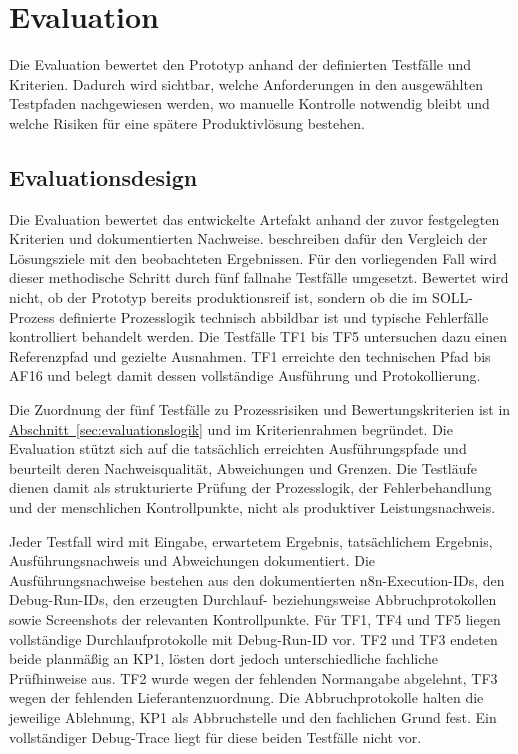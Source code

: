 \documentclass[a4paper,12pt]{article}
\begin{document}
\clearpage
\section{Evaluation}
\label{sec:evaluation}
Die Evaluation bewertet den Prototyp anhand der definierten Testfälle und Kriterien. Dadurch wird sichtbar, welche Anforderungen in den ausgewählten Testpfaden nachgewiesen werden, wo manuelle Kontrolle notwendig bleibt und welche Risiken für eine spätere Produktivlösung bestehen.

\subsection{Evaluationsdesign}
Die Evaluation bewertet das entwickelte Artefakt anhand der zuvor festgelegten Kriterien und dokumentierten Nachweise. \Textcite{peffers_design_2007} beschreiben dafür den Vergleich der Lösungsziele mit den beobachteten Ergebnissen. Für den vorliegenden Fall wird dieser methodische Schritt durch fünf fallnahe Testfälle umgesetzt. Bewertet wird nicht, ob der Prototyp bereits produktionsreif ist, sondern ob die im SOLL-Prozess definierte Prozesslogik technisch abbildbar ist und typische Fehlerfälle kontrolliert behandelt werden. Die Testfälle TF1 bis TF5 untersuchen dazu einen Referenzpfad und gezielte Ausnahmen. TF1 erreichte den technischen Pfad bis AF16 und belegt damit dessen vollständige Ausführung und Protokollierung.

Die Zuordnung der fünf Testfälle zu Prozessrisiken und Bewertungskriterien ist in \hyperref[sec:evaluationslogik]{Abschnitt~\ref*{sec:evaluationslogik}} und im Kriterienrahmen begründet. Die Evaluation stützt sich auf die tatsächlich erreichten Ausführungspfade und beurteilt deren Nachweisqualität, Abweichungen und Grenzen. Die Testläufe dienen damit als strukturierte Prüfung der Prozesslogik, der Fehlerbehandlung und der menschlichen Kontrollpunkte, nicht als produktiver Leistungsnachweis.

Jeder Testfall wird mit Eingabe, erwartetem Ergebnis, tatsächlichem Ergebnis, Ausführungsnachweis und Abweichungen dokumentiert. Die Ausführungsnachweise bestehen aus den dokumentierten n8n-Execution-IDs, den Debug-Run-IDs, den erzeugten Durchlauf- beziehungsweise Abbruchprotokollen sowie Screenshots der relevanten Kontrollpunkte. Für TF1, TF4 und TF5 liegen vollständige Durchlaufprotokolle mit Debug-Run-ID vor. TF2 und TF3 endeten beide planmäßig an KP1, lösten dort jedoch unterschiedliche fachliche Prüfhinweise aus. TF2 wurde wegen der fehlenden Normangabe abgelehnt, TF3 wegen der fehlenden Lieferantenzuordnung. Die Abbruchprotokolle halten die jeweilige Ablehnung, KP1 als Abbruchstelle und den fachlichen Grund fest. Ein vollständiger Debug-Trace liegt für diese beiden Testfälle nicht vor.
\end{document}
